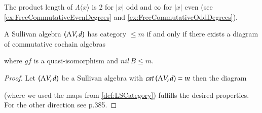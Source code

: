 \begin{Example}
 The product length of $\Lambda \langle x \rangle$ is 2 for $|x|$ odd and $\infty$ for $|x|$ even
 (see \ref{ex:FreeCommutativeEvenDegrees} and \ref{ex:FreeCommutativeOddDegrees}).
\end{Example}

\begin{Proposition}
  A Sullivan algebra $(\Lambda V,d)$ has category $ \leq m$ if and only if there exists a diagram of commutative cochain
  algebras 
  
  \centerline{
  }
  
  where $gf$ is a quasi-isomorphism and $nil \,B \leq m$.
\end{Proposition}

\begin{proof}

 Let $(\Lambda V,d)$ be a Sullivan algebra with $cat \, (\Lambda V,d) = m$ then the diagram 

  \centerline{
  }
(where we used the maps from \ref{def:LSCategory}) fulfills the desired properties.
For the other direction see \cite{Felix2001} p.385.

% 
% 
 
\end{proof}

